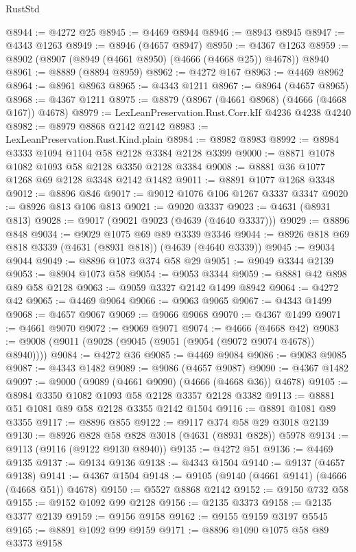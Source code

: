 \begin{lexlean}{RustStd}
\begin{coremodule}
{\begin{coremodule}
{{{{{{{{{{{{{{{{@8944 := @4272 @25
@8945 := @4469 @8944
@8946 := @8943 @8945
@8947 := @4343 @1263
@8949 := @8946 (@4657 @8947)
@8950 := @4367 @1263
@8959 := @8902 (@8907 (@8949 (@4661 @8950) (@4666 (@4668 @25)) @4678)) @8940
@8961 := @8889 (@8894 @8959)
@8962 := @4272 @167
@8963 := @4469 @8962
@8964 := @8961 @8963
@8965 := @4343 @1211
@8967 := @8964 (@4657 @8965)
@8968 := @4367 @1211
@8975 := @8879 (@8967 (@4661 @8968) (@4666 (@4668 @167)) @4678)
@8979 := LexLeanPreservation.Rust.Corr.kIf @4236 @4238 @4240
@8982 := @8979 @8868 @2142 @2142
@8983 := LexLeanPreservation.Rust.Kind.plain
@8984 := @8982 @8983
@8992 := @8984 @3333 @1094 @1104 @58 @2128 @3384 @2128 @3399
@9000 := @8871 @1078 @1082 @1093 @58 @2128 @3350 @2128 @3384
@9008 := @8881 @36 @1077 @1268 @69 @2128 @3348 @2142 @1482
@9011 := @8891 @1077 @1268 @3348
@9012 := @8896 @846
@9017 := @9012 @1076 @106 @1267 @3337 @3347
@9020 := @8926 @813 @106 @813
@9021 := @9020 @3337
@9023 := @4631 (@8931 @813)
@9028 := @9017 (@9021 @9023 (@4639 (@4640 @3337)))
@9029 := @8896 @848
@9034 := @9029 @1075 @69 @89 @3339 @3346
@9044 := @8926 @818 @69 @818 @3339 (@4631 (@8931 @818)) (@4639 (@4640 @3339))
@9045 := @9034 @9044
@9049 := @8896 @1073 @374 @58 @29
@9051 := @9049 @3344 @2139
@9053 := @8904 @1073 @58
@9054 := @9053 @3344
@9059 := @8881 @42 @898 @89 @58 @2128
@9063 := @9059 @3327 @2142 @1499 @8942
@9064 := @4272 @42
@9065 := @4469 @9064
@9066 := @9063 @9065
@9067 := @4343 @1499
@9068 := @4657 @9067
@9069 := @9066 @9068
@9070 := @4367 @1499
@9071 := @4661 @9070
@9072 := @9069 @9071
@9074 := @4666 (@4668 @42)
@9083 := @9008 (@9011 (@9028 (@9045 (@9051 (@9054 (@9072 @9074 @4678)) @8940))))
@9084 := @4272 @36
@9085 := @4469 @9084
@9086 := @9083 @9085
@9087 := @4343 @1482
@9089 := @9086 (@4657 @9087)
@9090 := @4367 @1482
@9097 := @9000 (@9089 (@4661 @9090) (@4666 (@4668 @36)) @4678)
@9105 := @8984 @3350 @1082 @1093 @58 @2128 @3357 @2128 @3382
@9113 := @8881 @51 @1081 @89 @58 @2128 @3355 @2142 @1504
@9116 := @8891 @1081 @89 @3355
@9117 := @8896 @855
@9122 := @9117 @374 @58 @29 @3018 @2139
@9130 := @8926 @828 @58 @828 @3018 (@4631 (@8931 @828)) @5978
@9134 := @9113 (@9116 (@9122 @9130 @8940))
@9135 := @4272 @51
@9136 := @4469 @9135
@9137 := @9134 @9136
@9138 := @4343 @1504
@9140 := @9137 (@4657 @9138)
@9141 := @4367 @1504
@9148 := @9105 (@9140 (@4661 @9141) (@4666 (@4668 @51)) @4678)
@9150 := @5527 @8868 @2142
@9152 := @9150 @732 @58
@9155 := @9152 @1092 @99 @2128
@9156 := @2135 @3373
@9158 := @2135 @3377 @2139
@9159 := @9156 @9158
@9162 := @9155 @9159 @3197 @5545
@9165 := @8891 @1092 @99 @9159
@9171 := @8896 @1090 @1075 @58 @89 @3373 @9158
}}}}}}}}}}}}}}}}
\end{coremodule}}
\end{coremodule}
\end{lexlean}
